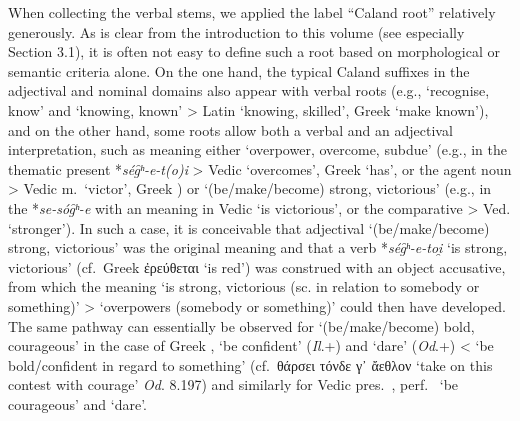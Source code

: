 \documentclass[output=paper,colorlinks,citecolor=brown]{langscibook}
\begin{document}
When collecting the verbal stems, we applied the label “Caland root” relatively generously. As is clear from the introduction to this volume (see especially Section 3.1), it is often not easy to define such a root based on morphological or semantic criteria alone. On the one hand, the typical Caland suffixes   in the adjectival and nominal domains also appear with verbal roots (e.g.,  ‘recognise, know’ and  ‘knowing, known’ > Latin  ‘knowing, skilled’, Greek  ‘make known’), and on the other hand, some roots allow both a verbal and an adjectival  interpretation, such as  meaning either ‘overpower, overcome, subdue’ (e.g., in the thematic present  *\textit{ség̑ʰ-e-t(o)i} > Vedic  ‘overcomes’, Greek  ‘has’, or the agent noun   > Vedic  m.\ ‘victor’, Greek ) or ‘(be/make/become) strong, victorious’ (e.g., in the  *\textit{se-sóg̑ʰ-e} with an  meaning in Vedic  ‘is victorious’, or the comparative  > Ved.  ‘stronger’). In such a case, it is conceivable that adjectival ‘(be/make/become) strong, victorious’ was the original meaning and that a verb *\textit{ség̑ʰ-e-toi̯} ‘is strong, victorious’ (cf.\ Greek ἐρεύθεται  ‘is red’) was construed with an object accusative, from which the meaning ‘is strong, victorious (sc. in relation to somebody or something)’ > ‘over\-powers (somebody or something)’ could then have developed. The same pathway can essentially be observed for  ‘(be/make/become) bold, courageous’ in the case of Greek ,  ‘be confident’ (\textit{Il}.+) and  ‘dare’ (\textit{Od}.+) < ‘be bold/confident in regard to something’ (cf.\ θάρσει τόνδε γ᾽ ἄεθλον ‘take on this contest with courage’ \textit{Od}. 8.197) and similarly for Vedic pres.\ , perf.\   ‘be courageous’ and  ‘dare’. 
\end{document}

